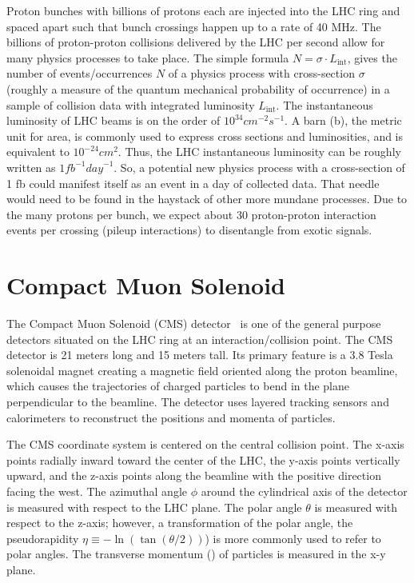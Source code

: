 Proton bunches with billions of protons each are injected into the LHC ring and 
spaced apart such that bunch crossings happen up to a rate of 40 MHz.
The billions of proton-proton collisions delivered by the LHC per second
allow for many physics processes to take place. The simple formula
$N = \sigma \cdot L_\text{int}$,
gives the number of events/occurrences $N$ of a physics process
with cross-section $\sigma$ (roughly a measure of the
quantum mechanical probability of occurrence) 
in a sample of collision data with integrated luminosity
$L_\text{int}$.
The instantaneous luminosity of LHC beams
is on the order of $10^{34} \unit{cm}^{-2} \unit{s}^{-1}$.
A barn (b), the metric unit for area, is commonly used to express cross sections and luminosities,
and is equivalent to $10^{-24} \unit{cm}^2$. Thus, the LHC instantaneous luminosity can
be roughly written as $1 \unit{fb}^{-1} \unit{day}^{-1}$.
So, a potential new physics process with a cross-section of 1 fb could
manifest itself as an event in a day of collected data.
That needle would need to be found in the haystack of 
other more mundane processes. Due to the many protons per bunch,
we expect about 30 proton-proton interaction events per crossing (pileup interactions)
to disentangle from exotic signals.


\section{Compact Muon Solenoid}

The Compact Muon Solenoid (CMS)
detector~\cite{CMS:Chatrchyan2008zzk,CMS:PTDR2} is one of the general purpose
detectors situated on the LHC ring at an interaction/collision point. 
The CMS detector is 21 meters long and 15 meters tall. Its primary feature
is a 3.8 Tesla solenoidal magnet creating a magnetic field oriented along the proton 
beamline, which causes the trajectories of charged particles to bend in the plane
perpendicular to the beamline.
The detector uses layered tracking sensors and calorimeters to reconstruct the
positions and momenta of particles.

The CMS coordinate system is centered on the central collision point.
The x-axis points radially inward toward the center of the LHC,
the y-axis points vertically upward, and the z-axis points along the beamline
with the positive direction facing the west. The azimuthal angle $\phi$
around the cylindrical axis of the detector
is measured with respect to the LHC plane. The polar angle $\theta$
is measured with respect to the z-axis; however, a 
transformation of the polar angle, the pseudorapidity $\eta \equiv -\ln (\tan (\theta/2))$) 
is more commonly used
to refer to polar angles. The transverse momentum (\pt) of particles 
is measured in the x-y plane.

